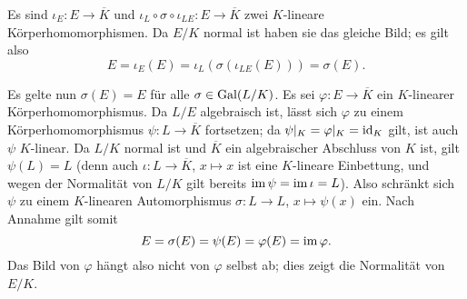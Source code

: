 \begin{solution}
\begin{itemize}
      Es sind $\iota_E \colon E \to \overline{K}$ und $\iota_L \circ \sigma \circ \iota_{LE} \colon E \to \overline{K}$ zwei $K$-lineare Körperhomomorphismen.
      Da $E/K$ normal ist haben sie das gleiche Bild; es gilt also
      \[
          E
        = \iota_E(E)
        = \iota_L(\sigma(\iota_{LE}(E)))
        = \sigma(E).
      \]
      
      Es gelte nun $\sigma(E) = E$ für alle $\sigma \in \operatorname{Gal}(L/K)$.
      Es sei $\varphi \colon E \to \overline{K}$ ein $K$-linearer Körperhomomorphismus.
      Da $L/E$ algebraisch ist, lässt sich $\varphi$ zu einem Körperhomomorphismus $\psi \colon L \to \overline{K}$ fortsetzen;
      da $\psi|_K = \varphi|_K = \operatorname{id}_K$ gilt, ist auch $\psi$ $K$-linear.
      Da $L/K$ normal ist und $\overline{K}$ ein algebraischer Abschluss von $K$ ist, gilt $\psi(L) = L$ (denn auch $\iota \colon L \to \overline{K}$, $x \mapsto x$ ist eine $K$-lineare Einbettung, und wegen der Normalität von $L/K$ gilt bereits $\operatorname{im} \psi = \operatorname{im} \iota = L$).
      Also schränkt sich $\psi$ zu einem $K$-linearen Automorphismus $\sigma \colon L \to L$, $x \mapsto \psi(x)$ ein.
      Nach Annahme gilt somit
      \[
          E
        = \sigma(E)
        = \psi(E)
        = \varphi(E)
        = \operatorname{im} \varphi.
      \]
      Das Bild von $\varphi$ hängt also nicht von $\varphi$ selbst ab;
      dies zeigt die Normalität von $E/K$.
  \end{itemize}
\end{solution}

